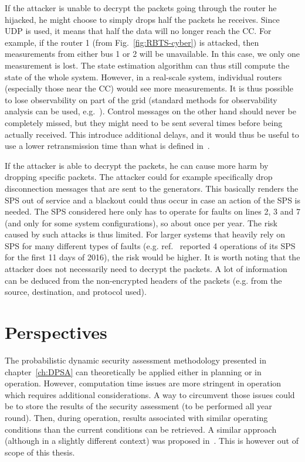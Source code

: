 If the attacker is unable to decrypt the packets going through the router he hijacked, he might choose to simply drops half the packets he receives. Since UDP is used, it means that half the data will no longer reach the CC. For example, if the router 1 (from Fig.~\ref{fig:RBTS-cyber}) is attacked, then measurements from either bus 1 or 2 will be unavailable. In this case, we only one measurement is lost. The state estimation algorithm can thus still compute the state of the whole system. However, in a real-scale system, individual routers (especially those near the CC) would see more measurements. It is thus possible to lose observability on part of the grid (standard methods for observability analysis can be used, e.g.~\cite{SEbook}). Control messages on the other hand should never be completely missed, but they might need to be sent several times before being actually received. This introduce additional delays, and it would thus be useful to use a lower retransmission time than what is defined in~\cite{roundTripTime}.

If the attacker is able to decrypt the packets, he can cause more harm by dropping specific packets. The attacker could for example specifically drop disconnection messages that are sent to the generators. This basically renders the SPS out of service and a blackout could thus occur in case an action of the SPS is needed. The SPS considered here only has to operate for faults on lines 2, 3 and 7 (and only for some system configurations), so about once per year. The risk caused by such attacks is thus limited. For larger systems that heavily rely on SPS for many different types of faults (e.g. ref.~\cite{GeorgiaSPS} reported 4 operations of its SPS for the first 11 days of 2016), the risk would be higher. It is worth noting that the attacker does not necessarily need to decrypt the packets. A lot of information can be deduced from the non-encrypted headers of the packets (e.g. from the source, destination, and protocol used).

\section{Perspectives}
\label{sec:SPSperspectives}

The probabilistic dynamic security assessment methodology presented in chapter~\ref{ch:DPSA} can theoretically be applied either in planning or in operation. However, computation time issues are more stringent in operation which requires additional considerations. A way to circumvent those issues could be to store the results of the security assessment (to be performed all year round). Then, during operation, results associated with similar operating conditions than the current conditions can be retrieved. A similar approach (although in a slightly different context) was proposed in~\cite{QimingChenThesis}. This is however out of scope of this thesis.

